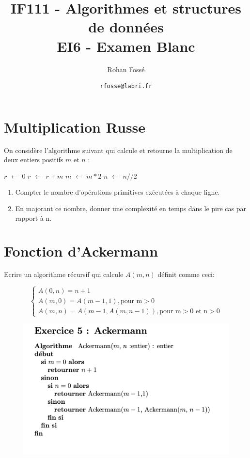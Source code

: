 \documentclass{article}[12pt]
\title{IF111 - Algorithmes et structures de données\\EI6 - Examen Blanc}
\date{\texttt{rfosse@labri.fr}}
\author{Rohan Fossé}
\newcommand*\Let[2]{\State #1 $\gets$ #2}
\begin{document}
\maketitle{}

\section{Multiplication Russe}
On considère l’algorithme suivant qui calcule et retourne la multiplication de deux entiers positifs $m$ et $n$ :

\begin{tcolorbox}
        \begin{algorithmic}[1]
    \Let{$r$}{$0$}
            \Let{$r$}{$r + m$}
        \EndIf
        \Let{$m$}{$m * 2$}
        \Let{$n$}{$n // 2$}
    \EndWhile
    \State{}
  \EndFunction
  \end{algorithmic}
 \end{tcolorbox} 

\begin{enumerate}
    \item Compter le nombre d’opérations primitives exécutées à chaque ligne.
    \item En majorant ce nombre, donner une complexité en temps dans le pire cas par rapport à n.
\end{enumerate}


\section{Fonction d'Ackermann}
Ecrire un algorithme récursif qui calcule $A(m, n)$ définit comme ceci:

$$
\left\{
    \begin{array}{ll}
        A(0,n) = n + 1 \\
        A(m,0) = A(m - 1, 1), \text{pour m} > \text{0}\\
        A(m,n) = A(m - 1,A(m,n - 1)), \text{pour m} > \text{0 et n} > \text{0}
    \end{array}
\right.
$$

\begin{figure}
    \centering
    \includegraphics[scale=0.4]{Ackerman.png}
    \label{fig:my_label}
\end{figure}
\end{document}
